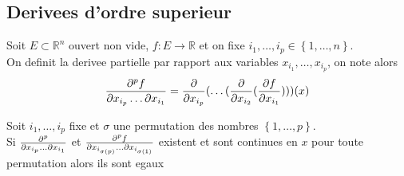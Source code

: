 \documentclass[../main.tex]{subfiles}
\begin{document}
\subsection{Derivees d'ordre superieur}
Soit $E\subset \mathbb{R}^n$ ouvert non vide, $f: E \to \mathbb{R}$ et on fixe $i_1, \ldots, i_p \in \left\{ 1, \ldots, n \right\} $.\\
On definit la derivee partielle par rapport aux variables $x_{i_1} , \ldots, x_{i_p} $, on note alors
\begin{align*}
	\frac{\partial ^{p}f}{\partial x_{i_p} \ldots \partial x_{i_1}  } = \frac{\partial }{\partial x_{i_p} }(  \ldots ( \frac{\partial }{\partial x_{i_2} }( \frac{\partial f}{ \partial x_{i_1} }) ) ) (x) 
\end{align*}
\begin{crly}
	Soit $i_1, \ldots, i_p$ fixe et $\sigma $ une permutation des nombres $ \left\{ 1, \ldots, p \right\} $.\\
	Si $ \frac{\partial ^{p}}{ \partial x_{i_p} \ldots \partial x_{i_1} }$ et $ \frac{\partial ^{p}f}{ \partial x_{i_{\sigma( p) } } \ldots \partial x_{i_{\sigma( 1) } } 	}$ existent et sont continues en $x$ pour toute permutation alors ils sont egaux
\end{crly}
\end{document}
